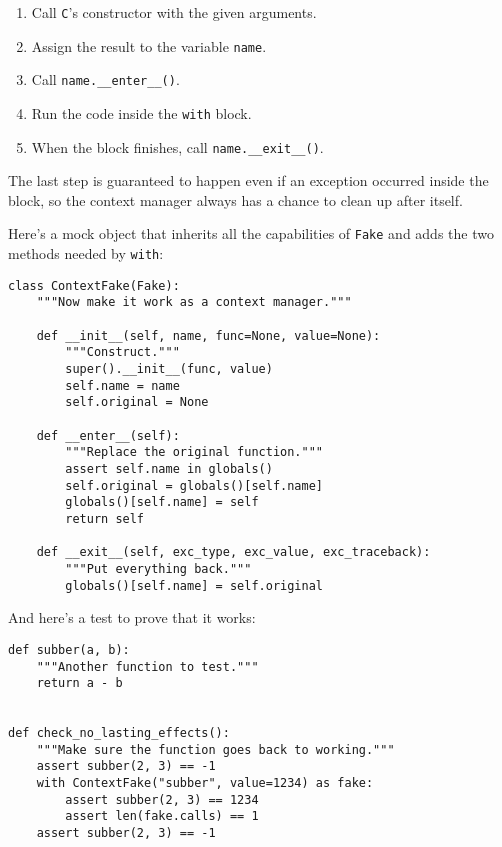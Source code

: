 \documentclass{scrbook}
\begin{document}
\begin{enumerate}

\item Call \texttt{C}'s constructor with the given arguments.

\item Assign the result to the variable \texttt{name}.

\item Call \texttt{name.\_\_enter\_\_()}.

\item Run the code inside the \texttt{with} block.

\item When the block finishes, call \texttt{name.\_\_exit\_\_()}.

\end{enumerate}


\noindent The last step is guaranteed to happen
even if an exception occurred inside the block,
so the context manager always has a chance to clean up after itself.


Here's a mock object that inherits all the capabilities of \texttt{Fake}
and adds the two methods needed by \texttt{with}:


\begin{lstlisting}[frame=single,frameround=tttt]
class ContextFake(Fake):
    """Now make it work as a context manager."""

    def __init__(self, name, func=None, value=None):
        """Construct."""
        super().__init__(func, value)
        self.name = name
        self.original = None

    def __enter__(self):
        """Replace the original function."""
        assert self.name in globals()
        self.original = globals()[self.name]
        globals()[self.name] = self
        return self

    def __exit__(self, exc_type, exc_value, exc_traceback):
        """Put everything back."""
        globals()[self.name] = self.original
\end{lstlisting}



\noindent And here's a test to prove that it works:


\begin{lstlisting}[frame=single,frameround=tttt]
def subber(a, b):
    """Another function to test."""
    return a - b


def check_no_lasting_effects():
    """Make sure the function goes back to working."""
    assert subber(2, 3) == -1
    with ContextFake("subber", value=1234) as fake:
        assert subber(2, 3) == 1234
        assert len(fake.calls) == 1
    assert subber(2, 3) == -1
\end{lstlisting}
\end{document}
